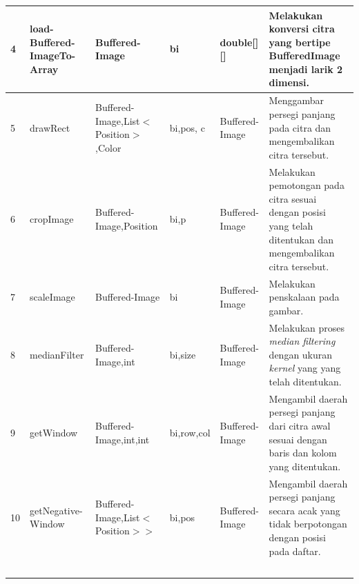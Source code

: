 \begin{small}
\begin{longtable}{|p{0.4cm}|p{2cm}|p{1.8cm}|p{1.8cm}|p{1.7cm}|p{3.55cm}|}
	\hline
	4 & load-\newline Buffered-\newline ImageTo-\newline Array & Buffered-\newline Image & bi & double[][] & Melakukan konversi citra yang bertipe BufferedImage menjadi larik 2 dimensi.\\
	\hline
	5 & drawRect & Buffered-\newline Image,\newline List$<$\newline Position$>$,\newline Color & bi,\newline pos, \newline c & Buffered-\newline Image & Menggambar persegi panjang pada citra dan mengembalikan citra tersebut.\\
	\hline
	6 & cropImage & Buffered-\newline Image,\newline Position & bi,\newline p & Buffered-\newline Image & Melakukan pemotongan pada citra sesuai dengan posisi yang telah ditentukan dan mengembalikan citra tersebut.\\
	\hline
	7 & scaleImage & Buffered-\newline Image & bi & Buffered-\newline Image & Melakukan penskalaan pada gambar.\\
	\hline
	8 & medianFilter & Buffered-\newline Image,\newline int & bi,\newline size & Buffered-\newline Image & Melakukan proses \textit{median filtering} dengan ukuran \textit{kernel} yang yang telah ditentukan.\\
	\hline
	9 & getWindow & Buffered-\newline Image,\newline int,\newline int & bi,\newline row,\newline col & Buffered-\newline Image & Mengambil daerah persegi panjang dari citra awal sesuai dengan baris dan kolom yang ditentukan.\\
	\hline
	10 & getNegative-\newline Window & Buffered-\newline Image,\newline List$<$\newline Position$>$$>$ & bi,\newline pos & Buffered-\newline Image & Mengambil daerah persegi panjang secara acak yang tidak berpotongan dengan posisi pada daftar.\\
$$
\end{longtable}
\end{small}
